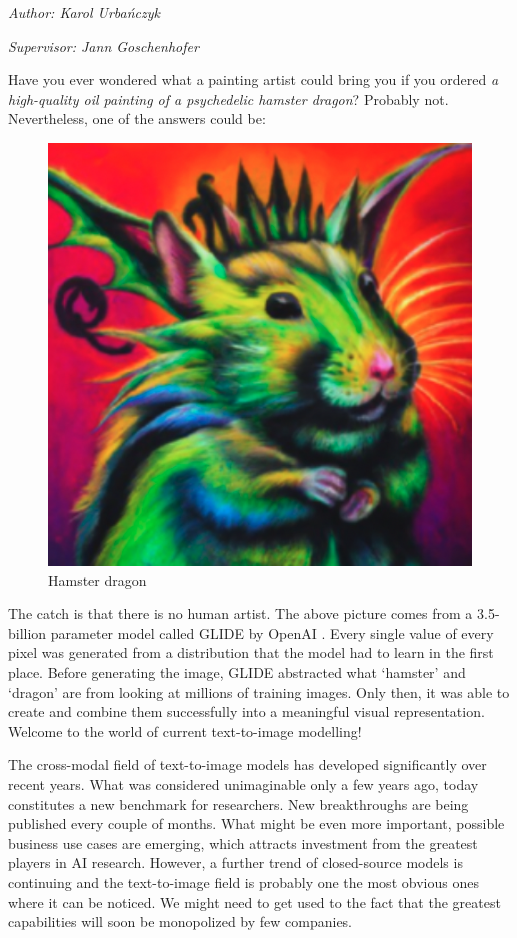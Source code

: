 \documentclass[
]{krantz}
\begin{document}
\emph{Author: Karol Urbańczyk}

\emph{Supervisor: Jann Goschenhofer}

Have you ever wondered what a painting artist could bring you if you ordered \emph{a high-quality oil painting of a psychedelic hamster dragon}? Probably not. Nevertheless, one of the answers could be:

\begin{figure}

{\centering \includegraphics[width=0.4\linewidth]{figures/02-02-text-2-img/hamsterdragon} 

}

\caption{Hamster dragon}\label{fig:hamsterdragon}
\end{figure}

The catch is that there is no human artist. The above picture comes from a 3.5-billion parameter model called GLIDE by OpenAI \citep{Glide2021}. Every single value of every pixel was generated from a distribution that the model had to learn in the first place. Before generating the image, GLIDE abstracted what `hamster' and `dragon' are from looking at millions of training images. Only then, it was able to create and combine them successfully into a meaningful visual representation. Welcome to the world of current text-to-image modelling!

The cross-modal field of text-to-image models has developed significantly over recent years. What was considered unimaginable only a few years ago, today constitutes a new benchmark for researchers. New breakthroughs are being published every couple of months. What might be even more important, possible business use cases are emerging, which attracts investment from the greatest players in AI research. However, a further trend of closed-source models is continuing and the text-to-image field is probably one the most obvious ones where it can be noticed. We might need to get used to the fact that the greatest capabilities will soon be monopolized by few companies.
\end{document}
